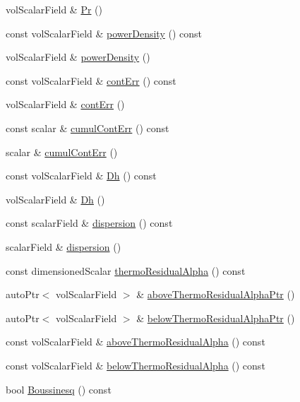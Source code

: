 \begin{DoxyCompactItemize}
vol\+Scalar\+Field \& \hyperlink{classFoam_1_1fluid_ae41df8adbf6baad015bb4e270a67a9e3}{Pr} ()
\item 
const vol\+Scalar\+Field \& \hyperlink{classFoam_1_1fluid_aff95d465650759a2c00c79eb7b070b8d}{power\+Density} () const
\item 
vol\+Scalar\+Field \& \hyperlink{classFoam_1_1fluid_acf9586cfd5a2533c0fc8c454f2066083}{power\+Density} ()
\item 
const vol\+Scalar\+Field \& \hyperlink{classFoam_1_1fluid_a5b0ea2c16d85ba1d495515665fd0d59a}{cont\+Err} () const
\item 
vol\+Scalar\+Field \& \hyperlink{classFoam_1_1fluid_a5b893ff94e875bc29883c8a54ecc4071}{cont\+Err} ()
\item 
const scalar \& \hyperlink{classFoam_1_1fluid_a9b122adb82391a8280974471be0952f2}{cumul\+Cont\+Err} () const
\item 
scalar \& \hyperlink{classFoam_1_1fluid_a8d0ed49195bd433f3dfecf83e43beccf}{cumul\+Cont\+Err} ()
\item 
const vol\+Scalar\+Field \& \hyperlink{classFoam_1_1fluid_ac7cf53b510afce511c82e2097ea86d02}{Dh} () const
\item 
vol\+Scalar\+Field \& \hyperlink{classFoam_1_1fluid_a21ea201ec743a9aef76e74b4e2e2f98a}{Dh} ()
\item 
const scalar\+Field \& \hyperlink{classFoam_1_1fluid_acbdfda4d5961a439295a329bf8ad4854}{dispersion} () const
\item 
scalar\+Field \& \hyperlink{classFoam_1_1fluid_a459bc822e6bc0ef6ace0322c601a83a6}{dispersion} ()
\item 
const dimensioned\+Scalar \hyperlink{classFoam_1_1fluid_ac105f8326bfcc36ca996ff7e0664fc1f}{thermo\+Residual\+Alpha} () const
\item 
auto\+Ptr$<$ vol\+Scalar\+Field $>$ \& \hyperlink{classFoam_1_1fluid_a6225759734aac460a750b7ea2606458d}{above\+Thermo\+Residual\+Alpha\+Ptr} ()
\item 
auto\+Ptr$<$ vol\+Scalar\+Field $>$ \& \hyperlink{classFoam_1_1fluid_a2e7fe56121639fb10c192ee28a988f86}{below\+Thermo\+Residual\+Alpha\+Ptr} ()
\item 
const vol\+Scalar\+Field \& \hyperlink{classFoam_1_1fluid_ab555f37891e6473ede4001f8d53be494}{above\+Thermo\+Residual\+Alpha} () const
\item 
const vol\+Scalar\+Field \& \hyperlink{classFoam_1_1fluid_a69c4a89e8f1547afd471633aa3246ff8}{below\+Thermo\+Residual\+Alpha} () const
\item 
bool \hyperlink{classFoam_1_1fluid_a0d2b3b5fda2fdcfa3da8dc7327348ddd}{Boussinesq} () const
\end{DoxyCompactItemize}
